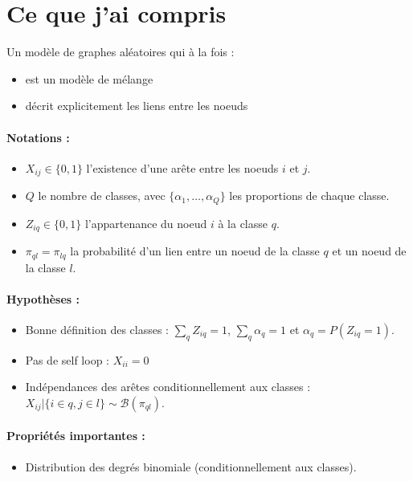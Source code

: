 \documentclass[12pt]{article}
\begin{document}
\setlength{\headheight}{15pt}

\section{Ce que j'ai compris}

Un modèle de graphes  aléatoires qui à la fois :
\begin{itemize}
    \item est un modèle de mélange
    \item décrit explicitement les liens entre les noeuds
\end{itemize}

\paragraph{Notations :}
\begin{itemize}
    \item $X_{ij}\in \{0,1\}$ l'existence d'une arête entre les noeuds $i$ et $j$.
    \item $Q$ le nombre de classes, avec $\{\alpha_1, \dots, \alpha_Q\}$ les proportions de chaque classe.
    \item $Z_{iq} \in \{0,1\}$ l'appartenance du noeud $i$ à la classe $q$.
    \item $\pi_{ql}=\pi_{lq}$ la probabilité d'un lien entre un noeud de la classe $q$ et un noeud de la classe $l$.
\end{itemize}

\paragraph{Hypothèses :}
\begin{itemize}
    \item Bonne définition des classes : $\sum_q Z_{iq}=1$, $\sum_q \alpha_q=1$ et $\alpha_q=P(Z_{iq}=1)$.
    \item Pas de self loop : $X_{ii}=0$
    \item Indépendances des arêtes conditionnellement aux classes : $X_{ij}| \{i\in q, j\in l\} \sim \mathcal{B}(\pi_{ql})$.
\end{itemize}

\paragraph{Propriétés importantes :}
\begin{itemize}
    \item Distribution des degrés binomiale (conditionnellement aux classes).
\end{itemize}
\end{document}
